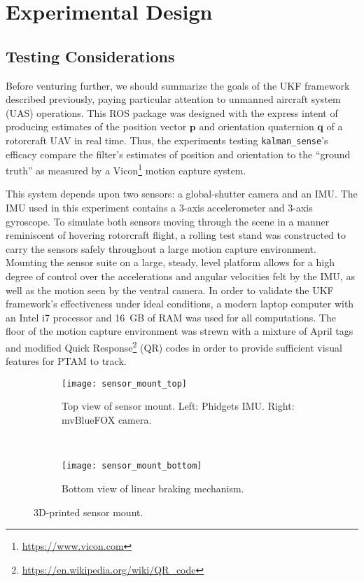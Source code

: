 \chapter{Experimental Design} \label{ch:Exp_Design}

\section{Testing Considerations}

Before venturing further, we should summarize the goals of the UKF framework described previously, paying particular attention to unmanned aircraft system (UAS) operations. This ROS package was designed with the express intent of producing estimates of the position vector $\mathbf{p}$ and orientation quaternion $\mathbf{q}$ of a rotorcraft UAV in real time. Thus, the experiments testing \texttt{kalman\_sense}'s efficacy compare the filter's estimates of position and orientation to the ``ground truth'' as measured by a Vicon\footnote{\url{https://www.vicon.com}} motion capture system.

This system depends upon two sensors: a global-shutter camera and an IMU. The IMU used in this experiment contains a 3-axis accelerometer and 3-axis gyroscope. To simulate both sensors moving through the scene in a manner reminiscent of hovering rotorcraft flight, a rolling test stand was constructed to carry the sensors safely throughout a large motion capture environment. Mounting the sensor suite on a large, steady, level platform allows for a high degree of control over the accelerations and angular velocities felt by the IMU, as well as the motion seen by the ventral camera. In order to validate the UKF framework's effectiveness under ideal conditions, a modern laptop computer with an Intel i7 processor and 16~GB of RAM was used for all computations. The floor of the motion capture environment was strewn with a mixture of April tags and modified Quick Response\footnote{\url{https://en.wikipedia.org/wiki/QR_code}} (QR) codes in order to provide sufficient visual features for PTAM to track.

\begin{figure}[t!]
    \centering
    \begin{subfigure}[t]{0.5\textwidth}
        \centering
        \texttt{[image: sensor\_mount\_top]}
        \caption{Top view of sensor mount. Left: Phidgets IMU. Right: mvBlueFOX camera.}
    \end{subfigure}%
    ~ 
    \begin{subfigure}[t]{0.5\textwidth}
        \centering
        \texttt{[image: sensor\_mount\_bottom]}
        \caption{Bottom view of linear braking mechanism.}
    \end{subfigure}
    \caption[3D-printed sensor mount]{3D-printed sensor mount.}
    \label{fig:sensor_mount}
\end{figure}

